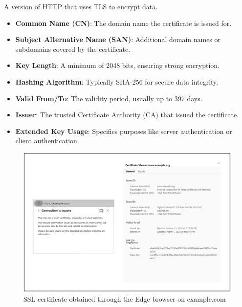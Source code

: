 \begin{Def}

    A version of HTTP that uses TLS to encrypt data. \hfill \cite{cloudflare_http_not_secure}
\end{Def}


\newpage 
\begin{Def}

    \begin{itemize}
        \item \textbf{Common Name (CN)}: The domain name the certificate is issued for.
        \item \textbf{Subject Alternative Name (SAN)}: Additional domain names or subdomains covered by the certificate.
        \item \textbf{Key Length}: A minimum of 2048 bits, ensuring strong encryption.
        \item \textbf{Hashing Algorithm}: Typically SHA-256 for secure data integrity.
        \item \textbf{Valid From/To}: The validity period, usually up to 397 days.
        \item \textbf{Issuer}: The trusted Certificate Authority (CA) that issued the certificate.
        \item \textbf{Extended Key Usage}: Specifies purposes like server authentication or client authentication.
    \end{itemize}
    \hfill \cite{kinsta_tls_ssl}
\end{Def}

\begin{figure}[h!]
    \centering
    \includegraphics[width=1\textwidth]{Sections/sec/cert.png}
    \caption{SSL certificate obtained through the Edge browser on example.com}
    \label{fig:cert}
\end{figure}

